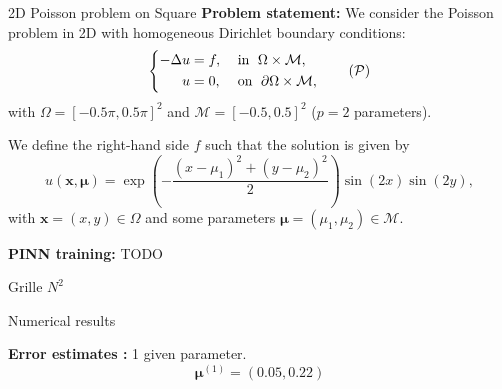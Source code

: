 \begin{frame}{2D Poisson problem on Square} 
	\textbf{Problem statement:} We consider the Poisson problem in 2D with homogeneous Dirichlet boundary conditions:
	\vspace{-5pt}
	\begin{equation}
		\left\{
		\begin{aligned}
			-\Delta u & = f, \; &  & \text{in } \; \Omega \times \mathcal{M}, \\
			u         & =0, \;  &  & \text{on } \; \partial\Omega \times \mathcal{M},
		\end{aligned}
		\right.
		\label{eq:Lap2D}\tag{$\mathcal{P}$}
	\end{equation}
	with $\Omega=[-0.5 \pi, 0.5 \pi]^2$ and $\mathcal{M}=[-0.5,0.5]^2$ ($p=2$ parameters).
		
	We define the right-hand side $f$ such that the solution is given by
	\begin{equation*}
		u(\bm{x},\bm{\mu})=\exp\left(-\frac{(x-\mu_1)^2+(y-\mu_2)^2}{2}\right)\sin(2 x)\sin(2 y),
	\end{equation*}
	with $\bm{x}=(x,y)\in\Omega$ and some parameters $\bm{\mu}=(\mu_1,\mu_2) \in \mathcal{M}$.

	\textbf{PINN training:} TODO

	Grille $N^2$
\end{frame}

\begin{frame}{Numerical results}
	\hspace{-5pt}\begin{minipage}[t]{0.46\linewidth}
		\textbf{Error estimates :} 1 given parameter.
		$$\bm{\mu}^{(1)}=(0.05, 0.22) $$
		\vspace{-35pt}
		\begin{figure}[H]
		\end{figure}
	\end{minipage} \qquad \small
	\begin{minipage}[t]{0.48\linewidth}
	\end{minipage}
\end{frame}

